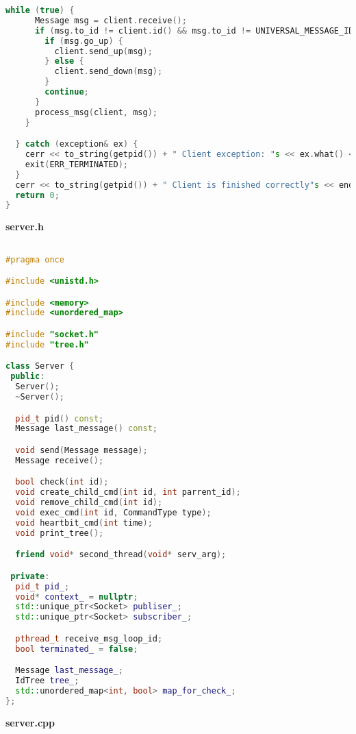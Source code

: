 \begin{lstlisting}[language=C++]
    while (true) {
      Message msg = client.receive();
      if (msg.to_id != client.id() && msg.to_id != UNIVERSAL_MESSAGE_ID) {
        if (msg.go_up) {
          client.send_up(msg);
        } else {
          client.send_down(msg);
        }
        continue;
      }
      process_msg(client, msg);
    }

  } catch (exception& ex) {
    cerr << to_string(getpid()) + " Client exception: "s << ex.what() << "\nTerminated by exception" << endl;
    exit(ERR_TERMINATED);
  }
  cerr << to_string(getpid()) + " Client is finished correctly"s << endl;
  return 0;
}

\end{lstlisting}

\textbf{server.h}

\begin{lstlisting}[language=C++]

#pragma once

#include <unistd.h>

#include <memory>
#include <unordered_map>

#include "socket.h"
#include "tree.h"

class Server {
 public:
  Server();
  ~Server();

  pid_t pid() const;
  Message last_message() const;

  void send(Message message);
  Message receive();

  bool check(int id);
  void create_child_cmd(int id, int parrent_id);
  void remove_child_cmd(int id);
  void exec_cmd(int id, CommandType type);
  void heartbit_cmd(int time);
  void print_tree();

  friend void* second_thread(void* serv_arg);

 private:
  pid_t pid_;
  void* context_ = nullptr;
  std::unique_ptr<Socket> publiser_;
  std::unique_ptr<Socket> subscriber_;

  pthread_t receive_msg_loop_id;
  bool terminated_ = false;

  Message last_message_;
  IdTree tree_;
  std::unordered_map<int, bool> map_for_check_;
};

\end{lstlisting}

\textbf{server.cpp}

